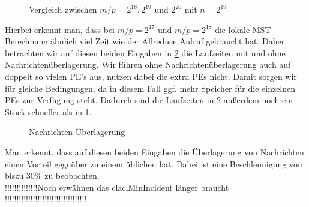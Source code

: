 \begin{figure}[H]
    \centering
    
    
    
    \caption{Vergleich zwischen $m/p= 2^{18},  2^{19}$ und $2^{20}$ mit $n=2^{19}$}
    \label{X-Img}
\end{figure}

Hierbei erkennt man, dass bei $m/p=2^{17}$ und $m/p=2^{18}$ die lokale MST Berechnung ähnlich viel Zeit wie der Allreduce Aufruf gebraucht hat. Daher betrachten wir auf diesen beiden Eingaben in \cref{Overlap-Img} die Laufzeiten \boruvkaAllreduce mit und ohne Nachrichtenüberlagerung. Wir führen \boruvkaAllreduce ohne Nachrichtenüberlagerung auch auf doppelt so vielen PE's aus, nutzen dabei die extra PEs nicht. 
Damit sorgen wir für gleiche Bedingungen, da in diesem Fall ggf. mehr Speicher für die einzelnen PEs zur Verfügung steht. Dadurch sind die Laufzeiten in \cref{Overlap-Img} außerdem noch ein Stück schneller als in \cref{X-Img}.

\begin{figure}[H]
    \centering
    
     
    \caption{Nachrichten Überlagerung}
    \label{Overlap-Img}
\end{figure}

Man erkennt, dass auf diesen beiden Eingaben die Überlagerung von Nachrichten einen Vorteil gegnüber zu einem üblichen \boruvkaAllreduce hat. Dabei ist eine Beschleunigung von biszu 30\% zu beobachten.\\ 



!!!!!!!!!!!!!!Noch erwähnen das claclMinIncident länger braucht !!!!!!!!!!!!!!!!!!!!!!!!!!!!!!!!!!!
